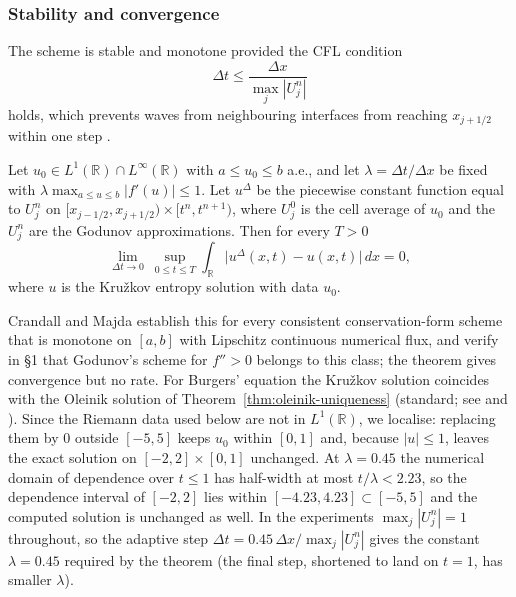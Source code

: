 \subsubsection{Stability and convergence}
\label{subsubsec:godunov-convergence}

The scheme is stable and monotone provided the CFL condition
\begin{equation}
  \label{eq:cfl}
  \Delta t \le \frac{\Delta x}{\max_j |U_j^n|}
\end{equation}
holds, which prevents waves from neighbouring interfaces from reaching
$x_{j+1/2}$ within one step \cite[Ch.~4]{leveque2002}.

\begin{theorem}
\label{thm:godunov-convergence}
Let $u_0\in L^1(\mathbb{R})\cap L^\infty(\mathbb{R})$ with $a\le u_0\le b$ a.e.,
and let $\lambda=\Delta t/\Delta x$ be fixed with
$\lambda\max_{a\le u\le b}|f'(u)|\le1$. Let $u^{\Delta}$ be the piecewise
constant function equal to $U_j^n$ on $[x_{j-1/2},x_{j+1/2})\times[t^n,t^{n+1})$,
where $U_j^0$ is the cell average of $u_0$ and the $U_j^n$ are the Godunov
approximations. Then for every $T>0$
\begin{equation*}
  \lim_{\Delta t\to0}\ \sup_{0\le t\le T}\int_{\mathbb{R}}\big|u^{\Delta}(x,t)-u(x,t)\big|\,dx=0,
\end{equation*}
where $u$ is the Kru\v{z}kov entropy solution \cite{kruzhkov1970} with data $u_0$.
\end{theorem}

Crandall and Majda establish this for every consistent conservation-form scheme
that is monotone on $[a,b]$ with Lipschitz continuous numerical flux, and verify
in \S1 that Godunov's scheme for $f''>0$ belongs to this class; the theorem
gives convergence but no rate. For Burgers' equation the Kru\v{z}kov solution
coincides with the Oleinik solution of Theorem~\ref{thm:oleinik-uniqueness}
(standard; see \cite[\S3.4]{evans2010} and \cite{kruzhkov1970}). Since the
Riemann data used below are not in $L^1(\mathbb{R})$, we localise: replacing
them by $0$ outside $[-5,5]$ keeps $u_0$ within $[0,1]$ and, because $|u|\le1$,
leaves the exact solution on $[-2,2]\times[0,1]$ unchanged. At $\lambda=0.45$ the
numerical domain of dependence over $t\le1$ has half-width at most
$t/\lambda<2.23$, so the dependence interval of $[-2,2]$ lies within
$[-4.23,4.23]\subset[-5,5]$ and the computed solution is unchanged as well.
In the experiments $\max_j|U_j^n|=1$ throughout, so the adaptive step
$\Delta t=0.45\,\Delta x/\max_j|U_j^n|$ gives the constant $\lambda=0.45$
required by the theorem (the final step, shortened to land on $t=1$, has smaller
$\lambda$).

